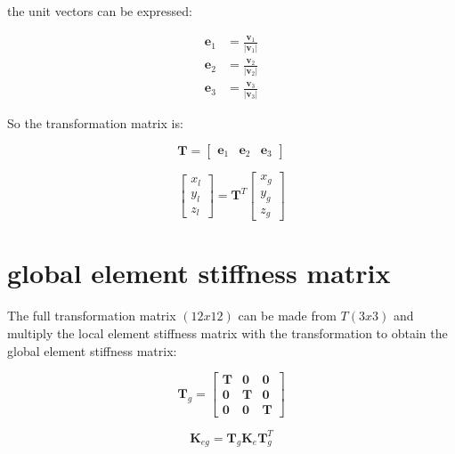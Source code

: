 the unit vectors can be expressed:

\begin{align*}
	\mathbf{e}_1 &= \frac{\mathbf{v}_1}{|\mathbf{v}_1|} \\
	\mathbf{e}_2 &= \frac{\mathbf{v}_2}{|\mathbf{v}_2|} \\
	\mathbf{e}_3 &= \frac{\mathbf{v}_3}{|\mathbf{v}_3|}
\end{align*}

So the transformation matrix is:

\begin{equation}
\mathbf{T} = \begin{bmatrix}
\mathbf{e}_1 & \mathbf{e}_2 & \mathbf{e}_3
\end{bmatrix} 
\end{equation}

\begin{equation}
\begin{bmatrix}
x_l \\ 
y_l \\ 
z_l
\end{bmatrix} = \mathbf{T}^T \begin{bmatrix}
x_g \\ 
y_g \\ 
z_g
\end{bmatrix} 
\end{equation}

\section{global element stiffness matrix}
The full transformation matrix $ (12x12) $ can be made from $ T (3x3) $ and multiply the local element stiffness matrix with the transformation to obtain the global element stiffness matrix:

\begin{equation}\label{eq: full transformation matrix for plate.}
\mathbf{T}_g = \begin{bmatrix}
\mathbf{T} & \mathbf{0} & \mathbf{0} \\ 
\mathbf{0} & \mathbf{T} & \mathbf{0} \\ 
\mathbf{0} & \mathbf{0} & \mathbf{T}
\end{bmatrix} 
\end{equation}

\begin{equation}\label{eq: gobal element stiffness matrix}
\mathbf{K}_{eg} = \mathbf{T}_g \mathbf{K}_e \mathbf{T}_g^T
\end{equation}